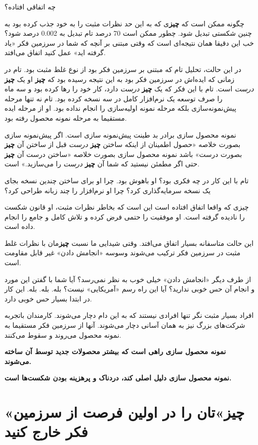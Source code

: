چه اتفاقی افتاده؟

چگونه ممکن است که \textbf{چیز}ی که به این حد نظرات مثبت را به خود جذب
کرده بود به چنین شکستی تبدیل شود. چطور ممکن است 70 درصد تام تبدیل به
0.002 درصد شود؟ خب این دقیقا همان نتیجه‌ای است که وقتی مبتنی بر آنچه که
شما در سرزمین فکر «یاد گرفته اید» عمل کنید اتفاق می‌افتد.

در این حالت، تحلیل تام که مبتنی بر سرزمین فکر بود از نوع غلط مثبت بود.
تام در زمانی که ایده‌اش در سرزمین فکر بود به این نتیجه رسیده بود که
\textbf{چیز} او یک \textbf{چیز} \emph{درست} است. تام با این فکر که یک
\textbf{چیز} \emph{درست} دارد، کار خود را رها کرده بود و سه ماه را صرف
توسعه یک نرم‌افزار کامل در سه نسخه کرده بود. تام نه تنها مرحله
پیش‌نمونه‌سازی بلکه مرحله نمونه اولیه‌سازی را انجام نداده بود. او از
مرحله ایده مستقیما به مرحله نمونه محصول رفته بود.

نمونه محصول سازی برادر بد طینت پیش‌نمونه سازی است. اگر پیش‌نمونه سازی
بصورت خلاصه «حصول اطمینان از اینکه ساختن \textbf{چیز} \emph{درست} قبل از
ساختن آن \textbf{چیز} بصورت درست» باشد نمونه محصول سازی بصورت خلاصه
«ساختن درست آن \textbf{چیز} حتی اگر مطمئن نیستید که شما آن \textbf{چیز}
\emph{درست} را می‌سازید.» است.

تام با این کار در چه فکری بود؟ او باهوش بود. چرا او برای ساختن چندین
نسخه بجای یک نسخه سرمایه‌گذاری کرد؟ چرا او نرم‌افزار را چند زبانه طراحی
کرد؟

چیزی که واقعا اتفاق افتاده است این است که بخاطر نظرات مثبت، او قانون
شکست را نادیده گرفته است. او موفقیت را حتمی فرض کرده و تلاش کامل و جامع
را انجام داده است.

این حالت متاسفانه بسیار اتفاق می‌افتد. وقتی شیدایی ما نسبت
\textbf{چیز}مان با نظرات غلط مثبت در سرزمین فکر ترکیب می‌شوند وسوسه
«انجامش دادن» غیر قابل مقاومت است.

از طرف دیگر «انجامش دادن» خیلی خوب به نظر نمی‌رسد؟ آیا شما با گفتن این
مورد و انجام آن حس خوبی ندارید؟ آیا این راه رسم «آمریکایی» نیست؟ بله.
بله. بله. این کار در ابتدا بسیار حس خوبی دارد.

افراد بسیار مثبت نگر تنها افرادی نیستند که به این دام دچار می‌شوند.
کارمندان باتجربه شرکت‌های بزرگ نیز به همان آسانی دچار می‌شوند. آنها از
سرزمین فکر مستقیما به نمونه محصول می‌روند و سقوط می‌کنند.

\textbf{نمونه محصول سازی راهی است که بیشتر محصولات جدید توسط آن ساخته
می‌شوند.}

\textbf{نمونه محصول سازی دلیل اصلی کند، دردناک و پرهزینه بودن شکست‌ها
است.}

\section{«چیز»تان را در اولین فرصت از سرزمین فکر خارج
کنید}\label{ux686ux6ccux632ux62aux627ux646-ux631ux627-ux62fux631-ux627ux648ux644ux6ccux646-ux641ux631ux635ux62a-ux627ux632-ux633ux631ux632ux645ux6ccux646-ux641ux6a9ux631-ux62eux627ux631ux62c-ux6a9ux646ux6ccux62f}

